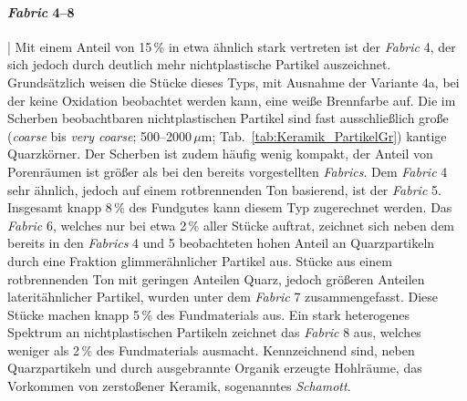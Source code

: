 \begin{multicols}{2}
\paragraph{\textit{Fabric} 4--8}\hspace{-.5em}|\hspace{.5em}%
Mit einem Anteil von 15\,\% in etwa ähnlich stark vertreten ist der \textit{Fabric} 4, der sich jedoch durch deutlich mehr nichtplastische Partikel auszeichnet. Grundsätzlich weisen die Stücke dieses Typs, mit Ausnahme der Variante 4a, bei der keine Oxidation beobachtet werden kann, eine weiße Brennfarbe auf. Die im Scherben beobachtbaren nichtplastischen Partikel sind fast ausschließlich große (\textit{coarse} bis \textit{very coarse}; 500--2000\,$\mu$m; Tab.~\ref{tab:Keramik_PartikelGr}) kantige Quarzkörner. Der Scherben ist zudem häufig wenig kompakt, der Anteil von Porenräumen ist größer als bei den bereits vorgestellten \textit{Fabrics}. Dem \textit{Fabric} 4 sehr ähnlich, jedoch auf einem rotbrennenden Ton basierend, ist der \textit{Fabric} 5. Insgesamt knapp 8\,\% des Fundgutes kann diesem Typ zugerechnet werden. Das \textit{Fabric} 6, welches nur bei etwa 2\,\% aller Stücke auftrat, zeichnet sich neben dem bereits in den \textit{Fabrics} 4 und 5 beobachteten hohen Anteil an Quarzpartikeln durch eine Fraktion glimmerähnlicher Partikel aus. Stücke aus einem rotbrennenden Ton mit geringen Anteilen Quarz, jedoch größeren Anteilen lateritähnlicher Partikel, wurden unter dem \textit{Fabric} 7 zusammengefasst. Diese Stücke machen knapp 5\,\% des Fundmaterials aus. Ein stark heterogenes Spektrum an nichtplastischen Partikeln zeichnet das \textit{Fabric} 8 aus, welches weniger als 2\,\% des Fundmaterials ausmacht. Kennzeichnend sind, neben Quarzpartikeln und durch ausgebrannte Organik erzeugte Hohlräume, das Vorkommen von zerstoßener Keramik, sogenanntes \textit{Schamott}.


\end{multicols}
